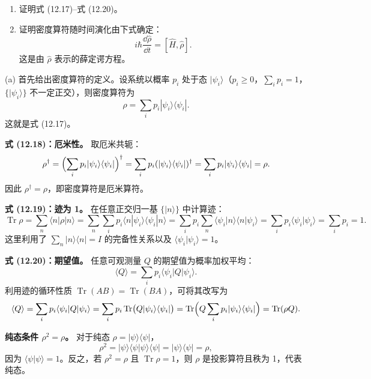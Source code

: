 \begin{question}
\begin{enumerate}
\item 证明式 (12.17)--式 (12.20)。
\item 证明密度算符随时间演化由下式确定：
\[
i\hbar\frac{\dd\hat\rho}{\dd t}=[\hat H,\hat\rho].
\]
这是由 $\hat\rho$ 表示的薛定谔方程。
\end{enumerate}

\par\smallskip
{}

\end{question}
\begin{solution}
(a) 首先给出密度算符的定义。设系统以概率 $p_i$ 处于态 $|\psi_i\rangle$（$p_i\ge0$，$\sum_i p_i=1$，$\{|\psi_i\rangle\}$ 不一定正交），则密度算符为
\[
\rho = \sum_i p_i |\psi_i\rangle\langle\psi_i|.
\]
这就是式 (12.17)。

\textbf{式 (12.18)：厄米性。}
取厄米共轭：
\[
\rho^\dagger = \Bigl(\sum_i p_i |\psi_i\rangle\langle\psi_i|\Bigr)^\dagger
= \sum_i p_i (|\psi_i\rangle\langle\psi_i|)^\dagger
= \sum_i p_i |\psi_i\rangle\langle\psi_i| = \rho.
\]
因此 $\rho^\dagger = \rho$，即密度算符是厄米算符。

\textbf{式 (12.19)：迹为 1。}
在任意正交归一基 $\{|n\rangle\}$ 中计算迹：
\[
\operatorname{Tr}\rho = \sum_n \langle n|\rho|n\rangle
= \sum_n \sum_i p_i \langle n|\psi_i\rangle\langle\psi_i|n\rangle
= \sum_i p_i \sum_n \langle\psi_i|n\rangle\langle n|\psi_i\rangle
= \sum_i p_i \langle\psi_i|\psi_i\rangle = \sum_i p_i = 1.
\]
这里利用了 $\sum_n |n\rangle\langle n| = I$ 的完备性关系以及 $\langle\psi_i|\psi_i\rangle=1$。

\textbf{式 (12.20)：期望值。}
任意可观测量 $Q$ 的期望值为概率加权平均：
\[
\langle Q\rangle = \sum_i p_i \langle\psi_i|Q|\psi_i\rangle.
\]
利用迹的循环性质 $\operatorname{Tr}(AB)=\operatorname{Tr}(BA)$，可将其改写为
\[
\langle Q\rangle = \sum_i p_i \langle\psi_i|Q|\psi_i\rangle
= \sum_i p_i \operatorname{Tr}\bigl(Q|\psi_i\rangle\langle\psi_i|\bigr)
= \operatorname{Tr}\Bigl(Q\sum_i p_i|\psi_i\rangle\langle\psi_i|\Bigr)
= \operatorname{Tr}(\rho Q).
\]

\textbf{纯态条件 $\rho^2=\rho$。}
对于纯态 $\rho=|\psi\rangle\langle\psi|$，
\[
\rho^2 = |\psi\rangle\langle\psi|\psi\rangle\langle\psi| = |\psi\rangle\langle\psi| = \rho,
\]
因为 $\langle\psi|\psi\rangle=1$。反之，若 $\rho^2=\rho$ 且 $\operatorname{Tr}\rho=1$，则 $\rho$ 是投影算符且秩为 1，代表纯态。


\end{solution}
